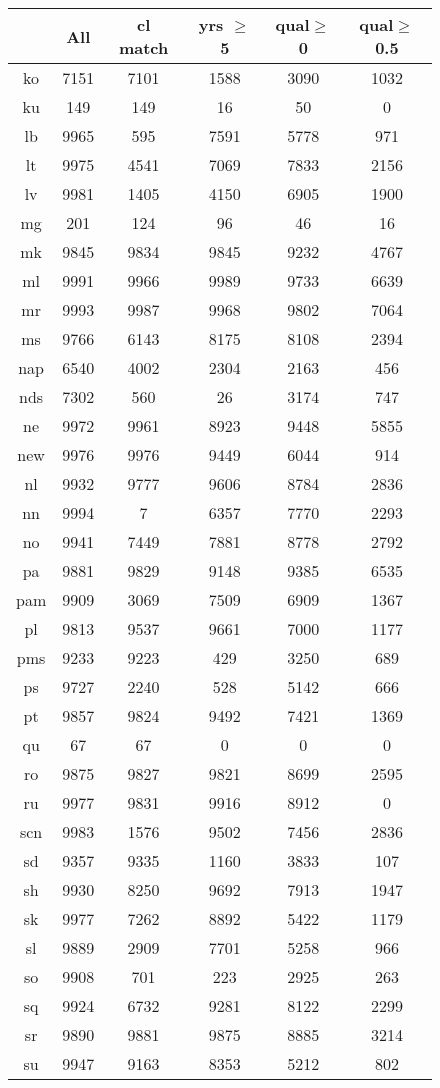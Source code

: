 \begin{figure}[h]
\centering
\begin{tabular}{cccccc}
&All&cl match&yrs $\geq$ 5&qual$\geq$0&qual$\geq$0.5\\
\hline\hline
ko&7151&7101&1588&3090&1032\\
ku&149&149&16&50&0\\
lb&9965&595&7591&5778&971\\
lt&9975&4541&7069&7833&2156\\
lv&9981&1405&4150&6905&1900\\
mg&201&124&96&46&16\\
mk&9845&9834&9845&9232&4767\\
ml&9991&9966&9989&9733&6639\\
mr&9993&9987&9968&9802&7064\\
ms&9766&6143&8175&8108&2394\\
nap&6540&4002&2304&2163&456\\
nds&7302&560&26&3174&747\\
ne&9972&9961&8923&9448&5855\\
new&9976&9976&9449&6044&914\\
nl&9932&9777&9606&8784&2836\\
nn&9994&7&6357&7770&2293\\
no&9941&7449&7881&8778&2792\\
pa&9881&9829&9148&9385&6535\\
pam&9909&3069&7509&6909&1367\\
pl&9813&9537&9661&7000&1177\\
pms&9233&9223&429&3250&689\\
ps&9727&2240&528&5142&666\\
pt&9857&9824&9492&7421&1369\\
qu&67&67&0&0&0\\
ro&9875&9827&9821&8699&2595\\
ru&9977&9831&9916&8912&0\\
scn&9983&1576&9502&7456&2836\\
sd&9357&9335&1160&3833&107\\
sh&9930&8250&9692&7913&1947\\
sk&9977&7262&8892&5422&1179\\
sl&9889&2909&7701&5258&966\\
so&9908&701&223&2925&263\\
sq&9924&6732&9281&8122&2299\\
sr&9890&9881&9875&8885&3214\\
su&9947&9163&8353&5212&802\\

\end{tabular}
\end{figure}
